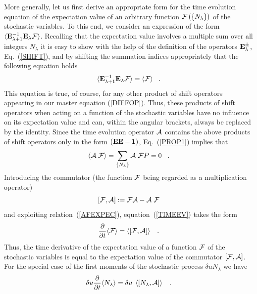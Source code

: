More generally, let us first derive an appropriate form for the time
evolution equation of the expectation value of an arbitrary function
${\cal{F}} \left( \{ N_{\lambda} \} \right)$ of the stochastic
variables.
To this end, we consider an expression of the form
$\langle {\bf{E}}_{\lambda + 1}^{-1}
{\bf{E}}_{\lambda} {\cal{F}} \rangle$.
Recalling that the expectation
value involves a multiple sum over all integers
$N_{\lambda}$ it is easy
to show with the help of the definition of the operators
${\bf{E}}^{\pm}_{\lambda}$, Eq.~(\ref{SHIFT}), and by shifting
the summation indices appropriately that the following equation
holds
\begin{equation}         \label{PROP1}
\langle {\bf{E}}_{\lambda +1}^{-1} {\bf{E}}_{\lambda}
{\cal{F}} \rangle
= \langle {\cal{F}} \rangle \;\;\; .
\end{equation}
This equation is true, of course, for any other product of
shift operators
appearing in our master equation (\ref{DIFFOP}).
Thus, these products of shift operators when
acting on a function of the stochastic variables have no influence
on its expectation value and can, within the angular brackets,
always be replaced by the identity. Since the time evolution
operator
${\cal{A}}$ contains the above products of shift operators
only in the
form $({\bf{E}} {\bf{E}} - {\bf{1}})$, Eq.~(\ref{PROP1})
implies that
\begin{equation}
\label{AFEXPEC}
\langle {\cal{A}} \; {\cal{F}} \rangle =
\sum_{\left\{N_{\lambda} \right\}}
{\cal{A}}\; {\cal{F}} P = 0
\;\;\; .
\end{equation}
Introducing the commutator (the function ${\cal{F}}$ being
regarded as a
multiplication operator)
\begin{equation}
\left[ {\cal{F}}, {\cal{A}} \right] := {\cal{F A}} - {\cal{A \; F}}
\end{equation}
and exploiting relation~(\ref{AFEXPEC}), equation~(\ref{TIMEEV})
takes the form
\begin{equation}     \label{HGLN}
\frac{\partial}{\partial t} \langle {\cal{F}} \rangle = \left\langle
\left[ {\cal{F}} , {\cal{A}} \right] \right\rangle
\;\;\; .
\end{equation}
Thus, the time derivative of the expectation value of a function
${\cal{F}}$ of the stochastic variables is equal to the expectation
value of the commutator $\left[{\cal{F}},{\cal{A}}\right]$.
For the special case of the first moments of the stochastic process
$\delta u N_{\lambda}$ we have
\begin{equation}
\label{MOMENT2}
\delta u \frac{\partial}{\partial t} \langle N_{\lambda} \rangle
= \delta u \; \left\langle \left[ N_{\lambda} , {\cal{A}} \right]
\right\rangle
\;\;\; .
\end{equation}
